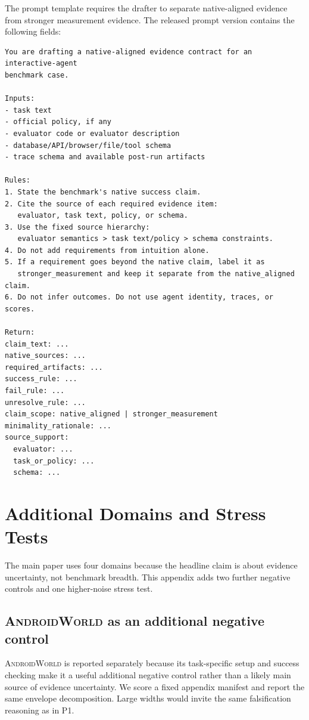\documentclass{article}
\newcommand{\androidworld}{\textsc{AndroidWorld}\xspace}
\begin{document}
The prompt template requires the drafter to separate native-aligned evidence
from stronger measurement evidence. The released prompt version contains the
following fields:

\begin{lstlisting}
You are drafting a native-aligned evidence contract for an interactive-agent
benchmark case.

Inputs:
- task text
- official policy, if any
- evaluator code or evaluator description
- database/API/browser/file/tool schema
- trace schema and available post-run artifacts

Rules:
1. State the benchmark's native success claim.
2. Cite the source of each required evidence item:
   evaluator, task text, policy, or schema.
3. Use the fixed source hierarchy:
   evaluator semantics > task text/policy > schema constraints.
4. Do not add requirements from intuition alone.
5. If a requirement goes beyond the native claim, label it as
   stronger_measurement and keep it separate from the native_aligned claim.
6. Do not infer outcomes. Do not use agent identity, traces, or scores.

Return:
claim_text: ...
native_sources: ...
required_artifacts: ...
success_rule: ...
fail_rule: ...
unresolve_rule: ...
claim_scope: native_aligned | stronger_measurement
minimality_rationale: ...
source_support:
  evaluator: ...
  task_or_policy: ...
  schema: ...
\end{lstlisting}

\section{Additional Domains and Stress Tests}
\label{app:aux-domains}

The main paper uses four domains because the headline claim is about evidence
uncertainty, not benchmark breadth. This appendix adds two further negative
controls and one higher-noise stress test.

\subsection{\androidworld as an additional negative control}

\androidworld is reported separately because its task-specific setup and
success checking make it a useful additional negative control rather than a
likely main source of evidence uncertainty. We score a fixed appendix manifest
and report the same envelope decomposition. Large widths would invite the same
falsification reasoning as in P1.
\end{document}
